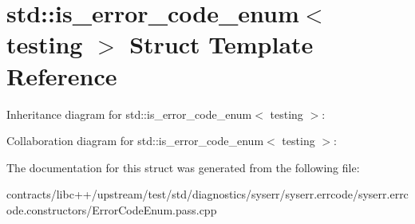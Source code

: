 \hypertarget{structstd_1_1is__error__code__enum_3_01testing_01_4}{}\section{std\+:\+:is\+\_\+error\+\_\+code\+\_\+enum$<$ testing $>$ Struct Template Reference}
\label{structstd_1_1is__error__code__enum_3_01testing_01_4}


Inheritance diagram for std\+:\+:is\+\_\+error\+\_\+code\+\_\+enum$<$ testing $>$\+:


Collaboration diagram for std\+:\+:is\+\_\+error\+\_\+code\+\_\+enum$<$ testing $>$\+:


The documentation for this struct was generated from the following file\+:\begin{DoxyCompactItemize}
\item 
contracts/libc++/upstream/test/std/diagnostics/syserr/syserr.\+errcode/syserr.\+errcode.\+constructors/Error\+Code\+Enum.\+pass.\+cpp\end{DoxyCompactItemize}
